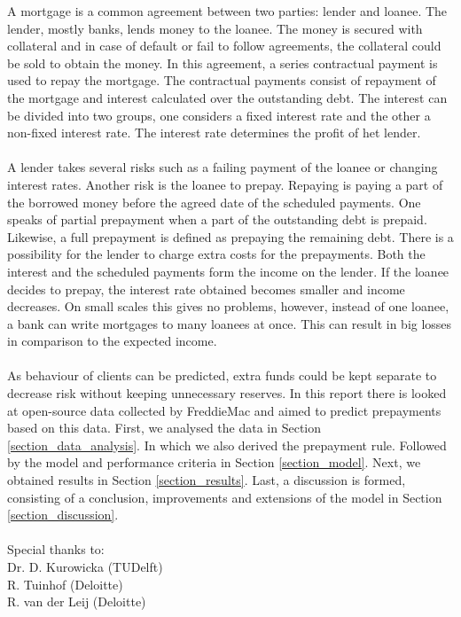 A mortgage is a common agreement between two parties: lender and loanee. The lender, mostly banks, lends money to the loanee. The money is secured with collateral and in case of default or fail to follow agreements, the collateral could be sold to obtain the money. In this agreement, a series contractual payment is used to repay the mortgage. The contractual payments consist of repayment of the mortgage and interest calculated over the outstanding debt. The interest can be divided into two groups, one considers a fixed interest rate and the other a non-fixed interest rate. The interest rate determines the profit of het lender. 
\\\\
A lender takes several risks such as a failing payment of the loanee or changing interest rates. Another risk is the loanee to prepay. Repaying is paying a part of the borrowed money before the agreed date of the scheduled payments. One speaks of partial prepayment when a part of the outstanding debt is prepaid. Likewise, a full prepayment is defined as prepaying the remaining debt. There is a possibility for the lender to charge extra costs for the prepayments. Both the interest and the scheduled payments form the income on the lender. If the loanee decides to prepay, the interest rate obtained becomes smaller and income decreases.  On small scales this gives no problems, however, instead of one loanee, a bank can write mortgages to many loanees at once. This can result in big losses in comparison to the expected income.  
\\\\
As behaviour of clients can be predicted, extra funds could be kept separate to decrease risk without keeping unnecessary reserves. In this report there is looked at open-source data collected by FreddieMac and aimed to predict prepayments based on this data. First, we analysed the data in Section \ref{section_data_analysis}. In which we also derived the prepayment rule. Followed by the model and performance criteria in Section \ref{section_model}. Next, we obtained results in Section \ref{section_results}. Last, a discussion is formed, consisting of a conclusion, improvements and extensions of the model in Section \ref{section_discussion}.
\\\\
Special thanks to:\\
Dr. D. Kurowicka (TUDelft)\\
R. Tuinhof (Deloitte)\\
R. van der Leij (Deloitte)
